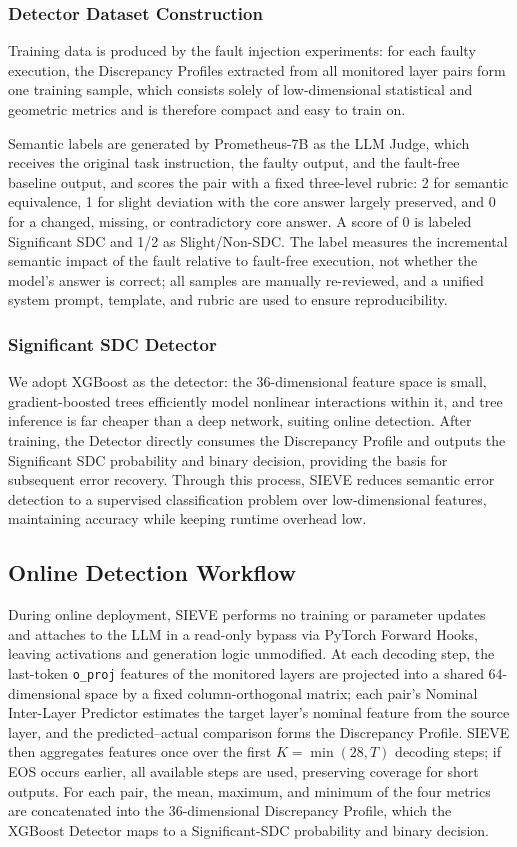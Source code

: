 \subsubsection{Detector Dataset Construction}

Training data is produced by the fault injection experiments: for each faulty execution, the Discrepancy Profiles extracted from all monitored layer pairs form one training sample, which consists solely of low-dimensional statistical and geometric metrics and is therefore compact and easy to train on.

Semantic labels are generated by Prometheus-7B as the LLM Judge, which receives the original task instruction, the faulty output, and the fault-free baseline output, and scores the pair with a fixed three-level rubric: 2 for semantic equivalence, 1 for slight deviation with the core answer largely preserved, and 0 for a changed, missing, or contradictory core answer. A score of 0 is labeled Significant SDC and 1/2 as Slight/Non-SDC. The label measures the incremental semantic impact of the fault relative to fault-free execution, not whether the model's answer is correct; all samples are manually re-reviewed, and a unified system prompt, template, and rubric are used to ensure reproducibility.

\subsubsection{Significant SDC Detector}
We adopt XGBoost as the detector: the 36-dimensional feature space is small, gradient-boosted trees efficiently model nonlinear interactions within it, and tree inference is far cheaper than a deep network, suiting online detection. After training, the Detector directly consumes the Discrepancy Profile and outputs the Significant SDC probability and binary decision, providing the basis for subsequent error recovery. Through this process, SIEVE reduces semantic error detection to a supervised classification problem over low-dimensional features, maintaining accuracy while keeping runtime overhead low.

\subsection{Online Detection Workflow}
During online deployment, SIEVE performs no training or parameter updates and attaches to the LLM in a read-only bypass via PyTorch Forward Hooks, leaving activations and generation logic unmodified. At each decoding step, the last-token \texttt{o\_proj} features of the monitored layers are projected into a shared 64-dimensional space by a fixed column-orthogonal matrix; each pair's Nominal Inter-Layer Predictor estimates the target layer's nominal feature from the source layer, and the predicted--actual comparison forms the Discrepancy Profile. SIEVE then aggregates features once over the first $K=\min(28,T)$ decoding steps; if EOS occurs earlier, all available steps are used, preserving coverage for short outputs. For each pair, the mean, maximum, and minimum of the four metrics are concatenated into the 36-dimensional Discrepancy Profile, which the XGBoost Detector maps to a Significant-SDC probability and binary decision.

